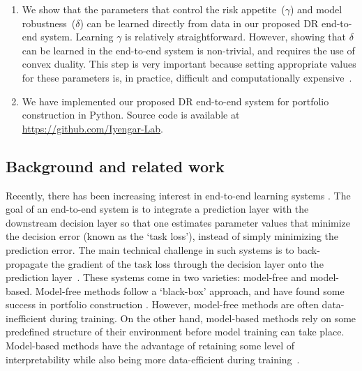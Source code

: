 \documentclass[10pt, twocolumn]{article}
\theoremstyle{plain}
\theoremstyle{definition}
\begin{document}
\begin{enumerate}[itemsep=-0.1em, topsep=0pt, leftmargin=*]
\item We show that the parameters that control the risk appetite~(\(\gamma\)) 
	and model robustness~(\(\delta\)) can be learned directly from data in our
    proposed DR end-to-end system. Learning \(\gamma\) is relatively straightforward. 
    However, showing that \(\delta\) can be learned in the end-to-end system is 
    non-trivial, and requires the use of convex duality. This step is very important 
    because setting appropriate values for these  parameters is, in practice, 
    difficult and computationally expensive~\citep{bertsimas2018data}. 
  
\item We have implemented our proposed DR end-to-end system for portfolio
    construction in Python. Source code is available at
    \href{https://github.com/Iyengar-Lab/E2E-DRO}{https://github.com/Iyengar-Lab}.  
\end{enumerate}

\subsection{Background and related work} 

Recently, there has been increasing
interest in end-to-end learning systems \citep{bengio1997using,
lecun2005off, thomas2006cognitive, elmachtoub2021smart}. The goal of an
end-to-end system is to integrate a prediction layer with the downstream
decision layer so that one estimates parameter values that minimize the
decision error (known as the `task loss'), instead of simply
minimizing the prediction error. The main technical challenge in such
systems is to back-propagate the gradient of the task loss through the
decision layer onto the prediction layer~\citep{amos2017optnet}. These
systems come in two varieties: model-free and model-based. Model-free
methods follow a `black-box' approach, and have found some success in
portfolio construction \citep{uysal2021end, zhang2020deepA}. However,
model-free methods are often data-inefficient during training. On the
other hand, model-based methods rely on some predefined structure of their
environment before model training can take place. Model-based methods have
the advantage of retaining some level of interpretability while also being
more data-efficient during training~\citep{amos2018differentiable}. 
\end{document}
